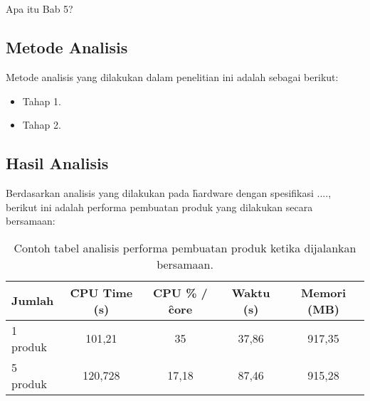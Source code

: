 \chapter{\babLima}
Apa itu Bab 5?



\section{Metode Analisis}
Metode analisis yang dilakukan dalam penelitian ini adalah sebagai berikut:
\begin{itemize}
	\item Tahap 1.
	\item Tahap 2.
\end{itemize}


\section{Hasil Analisis}
Berdasarkan analisis yang dilakukan pada \f{hardware} dengan spesifikasi ...., berikut ini adalah performa pembuatan produk yang dilakukan secara bersamaan:
\begin{table}
	\centering
	\begin{tabular}{|l|c|c|c|c|}
		\hline
		Jumlah   & \f{CPU Time} (s) & CPU \% / \f{core} & Waktu (s) & Memori (MB) \\ \hline
		1 produk & 101,21           & 35                & 37,86     & 917,35      \\ \hline
		5 produk & 120,728          & 17,18             & 87,46     & 915,28      \\ \hline
	\end{tabular}
	\caption{Contoh tabel analisis performa pembuatan produk ketika dijalankan bersamaan.}
	\label{table:sample}
\end{table}

